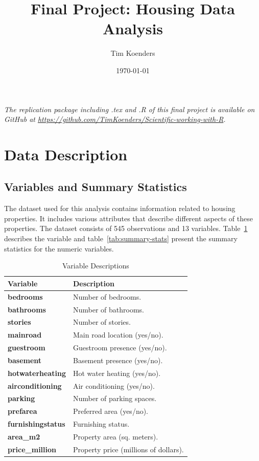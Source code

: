 \documentclass[10pt]{article}
\title{Final Project: Housing Data Analysis}
\author{Tim Koenders}
\date{\today}
\begin{document}
\maketitle

\tableofcontents 
\listoftables
\listoffigures

\vspace{0.5cm}

\begin{tcolorbox}
\centering \itshape The replication package including .tex and .R of this final project is available on GitHub at \href{https://github.com/TimKoenders/Scientific-working-with-R/tree/main/Final%20project}{https://github.com/TimKoenders/Scientific-working-with-R}.
\end{tcolorbox}

\newpage

\section{Data Description}

\subsection{Variables and Summary Statistics}

The dataset used for this analysis contains information related to housing properties. It includes various attributes that describe different aspects of these properties. The dataset consists of 545 observations and 13 variables. Table~\ref{tab:variables} describes the variable and table~\ref{tab:summary-stats} present the summary statistics for the numeric variables.

\begin{table}[ht]
\centering
\caption{Variable Descriptions}
\label{tab:variables}
\begin{tabular}{@{}ll@{}}
\toprule
\textbf{Variable} & \textbf{Description} \\
\midrule
\textbf{bedrooms} & Number of bedrooms. \\
\textbf{bathrooms} & Number of bathrooms. \\
\textbf{stories} & Number of stories. \\
\textbf{mainroad} & Main road location (yes/no). \\
\textbf{guestroom} & Guestroom presence (yes/no). \\
\textbf{basement} & Basement presence (yes/no). \\
\textbf{hotwaterheating} & Hot water heating (yes/no). \\
\textbf{airconditioning} & Air conditioning (yes/no). \\
\textbf{parking} & Number of parking spaces. \\
\textbf{prefarea} & Preferred area (yes/no). \\
\textbf{furnishingstatus} & Furnishing status. \\
\textbf{area\_m2} & Property area (sq. meters). \\
\textbf{price\_million} & Property price (millions of dollars). \\
\bottomrule
\end{tabular}
\end{table}
\end{document}
